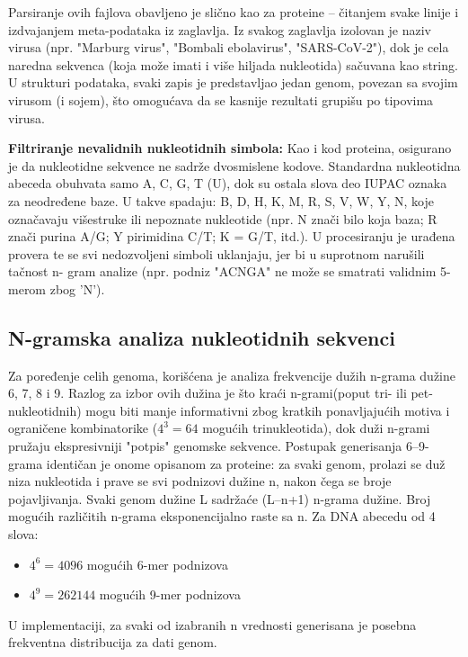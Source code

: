 \documentclass[a4paper,12pt]{article}
\begin{document}
Parsiranje ovih fajlova obavljeno
je slično kao za proteine – čitanjem svake linije i izdvajanjem meta-podataka iz zaglavlja. Iz svakog zaglavlja
izolovan je naziv virusa (npr. "Marburg virus", "Bombali ebolavirus", "SARS-CoV-2"), dok je cela naredna sekvenca (koja može imati i više hiljada nukleotida) sačuvana kao
string. U strukturi podataka, svaki zapis je predstavljao jedan genom, povezan sa svojim virusom (i
sojem), što omogućava da se kasnije rezultati grupišu po tipovima virusa.

\vspace{10pt}
\textbf{Filtriranje nevalidnih nukleotidnih simbola:} Kao i kod proteina, osigurano je da nukleotidne sekvence ne
sadrže dvosmislene kodove. Standardna nukleotidna abeceda obuhvata samo A, C, G, T (U), dok su ostala
slova deo IUPAC oznaka za neodređene baze. U takve spadaju: B, D, H, K, M, R, S, V, W, Y, N, koje
označavaju višestruke ili nepoznate nukleotide (npr. N znači bilo koja baza; R znači purina A/G; Y pirimidina
C/T; K = G/T, itd.). U procesiranju je urađena provera
te se svi nedozvoljeni simboli uklanjaju, jer bi u suprotnom narušili tačnost n-
gram analize (npr. podniz "ACNGA" ne može se smatrati validnim 5-merom zbog 'N').

\subsection{N-gramska analiza nukleotidnih sekvenci}

Za poređenje celih genoma, korišćena je analiza frekvencije
dužih n-grama dužine 6, 7, 8 i 9. Razlog za izbor ovih dužina je što kraći n-grami(poput
tri- ili pet-nukleotidnih) mogu biti manje informativni zbog kratkih ponavljajućih motiva i ograničene
kombinatorike ($4^3 = 64$
 mogućih trinukleotida), dok duži n-grami pružaju ekspresivniji "potpis"
genomske sekvence. Postupak generisanja 6–9-grama identičan je onome opisanom za proteine: za svaki
genom, prolazi se duž niza nukleotida i prave se svi podnizovi dužine n, nakon čega se broje pojavljivanja. Svaki genom dužine L sadržaće (L–n+1) n-grama dužine. Broj mogućih različitih n-grama
eksponencijalno raste sa n. Za DNA abecedu od 4 slova: \begin{itemize}
    \item $4^6 = 4096$ mogućih 6-mer podnizova
    \item $4^9 = 262144$ mogućih 9-mer podnizova
\end{itemize}
U
implementaciji, za svaki od izabranih n vrednosti generisana je posebna frekventna distribucija za dati
genom.
\end{document}
